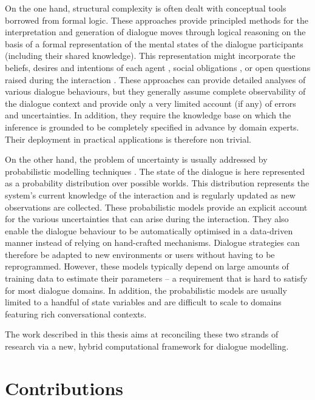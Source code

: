 On the one hand, structural complexity is often dealt with conceptual tools borrowed from formal logic.  These approaches provide principled methods for the interpretation and generation of dialogue moves through logical reasoning on the basis of a formal representation of the mental states of the dialogue participants (including their shared knowledge). This representation might incorporate the beliefs, desires and intentions of each agent \citep{Cohen1979,Allen1980}, social obligations \citep{Traum:1994}, or open questions raised during the interaction \citep{larsson2002,Ginzburg2012}.  These approaches can provide detailed analyses of various dialogue behaviours, but they generally assume complete observability of the dialogue context and provide only a very limited account (if any) of errors and uncertainties. In addition, they require the knowledge base on which the inference is grounded to be completely specified in advance by domain experts.  Their deployment in practical applications is therefore non trivial. 

On the other hand, the problem of uncertainty is usually addressed by probabilistic modelling techniques \citep{Roy:2000,FramptonL09,Young:2010}.  The state of the dialogue is here represented as a probability distribution over possible worlds.  This distribution represents the system's current knowledge of the interaction and is regularly updated as new observations are collected. These probabilistic models provide an explicit account for the various uncertainties that can arise during the interaction. They also enable the dialogue behaviour to be automatically optimised in a data-driven manner instead of relying on hand-crafted mechanisms.  Dialogue strategies can therefore be adapted to new environments or users without having to be reprogrammed. However, these models typically depend on large amounts of training data to estimate their parameters -- a requirement that is hard to satisfy for most dialogue domains.  In addition, the probabilistic models are usually limited to a handful of state variables and are difficult to scale to domains featuring rich conversational contexts. 

The work described in this thesis aims at reconciling these two strands of research via a new, hybrid computational framework for dialogue modelling. 

\section{Contributions}

